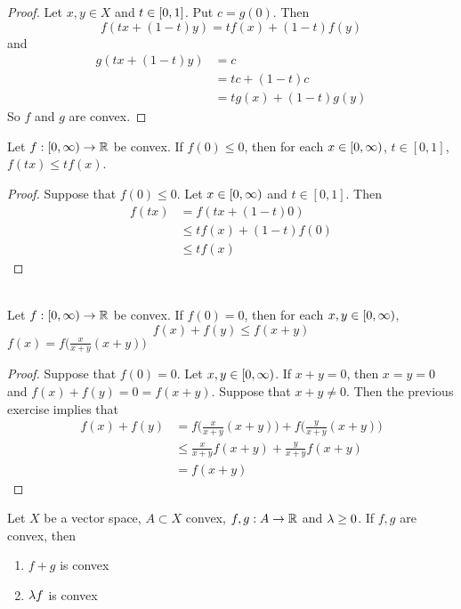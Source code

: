 \documentclass{book}
\begin{document}
	\begin{proof}
		Let $x, y \in X$ and $t \in [0,1]$. Put $c = g(0)$. Then $$f(tx + (1-t)y) = tf(x) + (1-t)f(y)$$ and 
		\begin{align*}
		g(tx + (1-t)y) 
		&= c\\ 
		&= tc + (1-t)c \\
		&= tg(x) + (1-t)g(y)
		\end{align*}
		So $f$ and $g$ are convex.
	\end{proof}		

	\begin{ex} 
		Let $f:[0,\infty) \rightarrow \mathbb{R}$ be convex. If $f(0) \leq 0$, then for each $x \in [0,\infty)$, $t \in [0,1]$, $f(tx) \leq tf(x)$.
	\end{ex}

	\begin{proof}
		Suppose that $f(0) \leq 0$. Let $x \in [0,\infty)$ and $t \in [0,1]$. Then 
		\begin{align*}
			f(tx)
			&= f(tx + (1-t)0) \\
			& \leq tf(x) + (1-t)f(0) \\
			& \leq tf(x)
		\end{align*}
	\end{proof}

	\begin{ex}  \\
		Let $f:[0,\infty) \rightarrow \mathbb{R}$ be convex. If $f(0) = 0$, then for each $x,y \in [0,\infty)$, $$f(x) + f(y) \leq f(x+y)$$
		 $f(x) = f \bigg( \frac{x}{x+y}(x+y)\bigg)$
	\end{ex}

	\begin{proof}
		Suppose that $f(0) = 0$. Let $x, y \in [0,\infty)$. If $x+y = 0$, then $x=y=0$ and $f(x) + f(y) = 0 = f(x+y)$. Suppose that $x+y \neq 0$. Then the previous exercise implies that 
		\begin{align*}
			f(x) + f(y) 
			&= f \bigg( \frac{x}{x+y}(x+y)\bigg) + f \bigg( \frac{y}{x+y}(x+y)\bigg) \\
			& \leq \frac{x}{x+y}f(x+y) + \frac{y}{x+y}f(x+y) \\
			&= f(x+y)
		\end{align*}
	\end{proof}
	
	\begin{ex} 
	Let $X$ be a vector space, $A \subset X$ convex, $f,g:A \rightarrow \mathbb{R}$ and $\lambda \geq 0$. If $f,g$ are convex, then 
	\begin{enumerate}
	\item $f + g$ is convex 
	\item $\lambda f$ is convex
	\end{enumerate}
	\end{ex}
	
\end{document}
